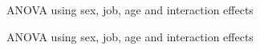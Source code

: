 \documentclass[12pt]{beamer}
\begin{document}
\begin{frame}{\textcolor{bscuro}{ANOVA using sex, job, age and interaction effects}}
	\begin{figure}[!ht] 
		\centering
	\end{figure}
\end{frame} 


\begin{frame}{\textcolor{bscuro}{ANOVA using sex, job, age and interaction effects}}
	\begin{figure}[!ht] 
		\centering
	\end{figure}
\end{frame}
\end{document}
